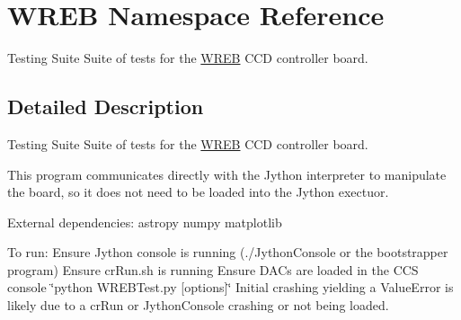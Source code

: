 \hypertarget{namespace_w_r_e_b}{}\section{W\+R\+EB Namespace Reference}
\label{namespace_w_r_e_b}


Testing Suite Suite of tests for the \hyperlink{namespace_w_r_e_b}{W\+R\+EB} C\+CD controller board.  




\subsection{Detailed Description}
Testing Suite Suite of tests for the \hyperlink{namespace_w_r_e_b}{W\+R\+EB} C\+CD controller board. 

This program communicates directly with the Jython interpreter to manipulate the board, so it does not need to be loaded into the Jython exectuor.

External dependencies\+: astropy numpy matplotlib

To run\+: Ensure Jython console is running (./\+Jython\+Console or the bootstrapper program) Ensure cr\+Run.\+sh is running Ensure D\+A\+Cs are loaded in the C\+CS console \char`\"{}python W\+R\+E\+B\+Test.\+py \mbox{[}options\mbox{]}\char`\"{} Initial crashing yielding a Value\+Error is likely due to a cr\+Run or Jython\+Console crashing or not being loaded. 